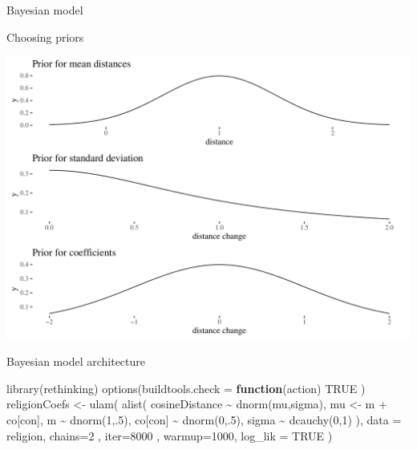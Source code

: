 \documentclass[
  10pt,
  ignorenonframetext,
  x11names, dvipsnames, bibspacing,natbib, table]{beamer}
\newenvironment{Shaded}{\begin{snugshade}}{\end{snugshade}}
\newcommand{\AttributeTok}[1]{\textcolor[rgb]{0.77,0.63,0.00}{#1}}
\newcommand{\ConstantTok}[1]{\textcolor[rgb]{0.00,0.00,0.00}{#1}}
\newcommand{\ControlFlowTok}[1]{\textcolor[rgb]{0.13,0.29,0.53}{\textbf{#1}}}
\newcommand{\DecValTok}[1]{\textcolor[rgb]{0.00,0.00,0.81}{#1}}
\newcommand{\FunctionTok}[1]{\textcolor[rgb]{0.00,0.00,0.00}{#1}}
\newcommand{\NormalTok}[1]{#1}
\newcommand{\OtherTok}[1]{\textcolor[rgb]{0.56,0.35,0.01}{#1}}
\newcommand{\SpecialCharTok}[1]{\textcolor[rgb]{0.00,0.00,0.00}{#1}}
\begin{document}
\begin{frame}{Bayesian model}
\protect\hypertarget{bayesian-model}{}
\begin{block}{Choosing priors}
\protect\hypertarget{choosing-priors}{}
\begin{center}\includegraphics[width=1\linewidth]{presentationBoston_files/figure-beamer/priorsVis-1} \end{center}
\end{block}
\end{frame}

\begin{frame}[fragile]{Bayesian model architecture}
\protect\hypertarget{bayesian-model-architecture}{}
\vspace{1mm}
\footnotesize

\begin{Shaded}
\begin{Highlighting}[]
\FunctionTok{library}\NormalTok{(rethinking)}
\FunctionTok{options}\NormalTok{(}\AttributeTok{buildtools.check =} \ControlFlowTok{function}\NormalTok{(action) }\ConstantTok{TRUE}\NormalTok{ )}
\NormalTok{religionCoefs }\OtherTok{\textless{}{-}} \FunctionTok{ulam}\NormalTok{(}
  \FunctionTok{alist}\NormalTok{(}
\NormalTok{    cosineDistance }\SpecialCharTok{\textasciitilde{}} \FunctionTok{dnorm}\NormalTok{(mu,sigma),}
\NormalTok{    mu }\OtherTok{\textless{}{-}}\NormalTok{ m }\SpecialCharTok{+}\NormalTok{ co[con],}
\NormalTok{    m }\SpecialCharTok{\textasciitilde{}} \FunctionTok{dnorm}\NormalTok{(}\DecValTok{1}\NormalTok{,.}\DecValTok{5}\NormalTok{),}
\NormalTok{    co[con] }\SpecialCharTok{\textasciitilde{}} \FunctionTok{dnorm}\NormalTok{(}\DecValTok{0}\NormalTok{,.}\DecValTok{5}\NormalTok{),}
\NormalTok{    sigma }\SpecialCharTok{\textasciitilde{}} \FunctionTok{dcauchy}\NormalTok{(}\DecValTok{0}\NormalTok{,}\DecValTok{1}\NormalTok{)}
\NormalTok{  ),}
  \AttributeTok{data =}\NormalTok{ religion,}
  \AttributeTok{chains=}\DecValTok{2}\NormalTok{ , }\AttributeTok{iter=}\DecValTok{8000}\NormalTok{ , }\AttributeTok{warmup=}\DecValTok{1000}\NormalTok{, }
  \AttributeTok{log\_lik =} \ConstantTok{TRUE}
\NormalTok{)}
\end{Highlighting}
\end{Shaded}

\normalsize
\end{frame}
\end{document}
